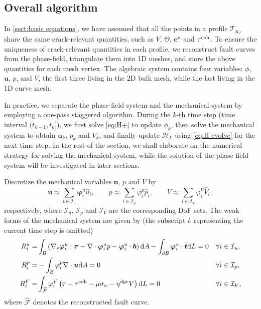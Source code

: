 \documentclass{article}
\begin{document}
\subsection{Overall algorithm}

In \cref{sect:basic equations}, we have assumed that all the points in a profile $\mathcal T_{\bm x_\mathcal F}$ share the same crack-relevant quantities, such as $V$, $\Theta$, $\bm e^n$ and $\tau^{\rm coh}$. To ensure the uniqueness of crack-relevant quantities in each profile, we reconstruct fault curves from the phase-field, triangulate them into 1D meshes, and store the above quantities for each mesh vertex. The algebraic system contains four variables: $\phi$, $\bm u$, $p$, and $V$, the first three living in the 2D bulk mesh, while the last living in the 1D curve mesh.

In practice, we separate the phase-field system and the mechanical system by employing a one-pass staggered algorithm. During the $k$-th time step (time interval $(t_{k-1}, t_k]$), we first solve \cref{eq:H+} to update $\phi_k$, then solve the mechanical system to obtain $\bm u_k$, $p_k$ and $V_k$, and finally update $\mathcal H_k$ using \cref{eq:H evolve} for the next time step. In the rest of the section, we shall elaborate on the numerical strategy for solving the mechanical system, while the solution of the phase-field system will be investigated in later sections.

Discretize the mechanical variables $\bm u$, $p$ and $V$ by
\begin{equation}
  \bm u\approx\sum_{i\in\mathcal I_u}\bm\varphi^u_i\hat u_i,\qquad
  p\approx\sum_{i\in\mathcal I_p}\varphi^p_i\hat p_i,\qquad
  V\approx\sum_{i\in\mathcal I_V}\varphi^V_i\widehat V_i,
\end{equation}
respectively, where $\mathcal I_u$, $\mathcal I_p$ and $\mathcal I_V$ are the corresponding DoF sets. The weak forms of the mechanical system are given by (the subscript $k$ representing the current time step is omitted) 
\begin{align}
  R^u_i
  =&\int_{\mathcal B}\left(\nabla_s\bm\varphi^u_i : \bm\tau - \nabla\cdot\bm\varphi_i^u p - \bm\varphi_i^u\cdot\bm b\right)\mathrm dA - 
    \int_{\partial\mathcal B}\bm\varphi_i^u\cdot\bar{\bm t}\mathrm dL = 0 & &\forall i\in\mathcal I_u,\label{eq:Ru} \\
  R^p_i
  =&-\int_{\mathcal B}\varphi_i^p\nabla\cdot\bm u\mathrm dA = 0 & &\forall i\in\mathcal I_p,\label{eq:Rp}\\
  R^V_i
  =&\int_{\widehat{\mathcal F}}\varphi_i^V\left(\tau - \tau^{\rm coh} - \mu\sigma_n - \eta^{\rm dpr}V\right)\mathrm dL = 0 
   & &\forall i\in\mathcal I_V\label{eq:RV raw},
\end{align}
where $\widehat{\mathcal F}$ denotes the reconstructed fault curve.
\end{document}
